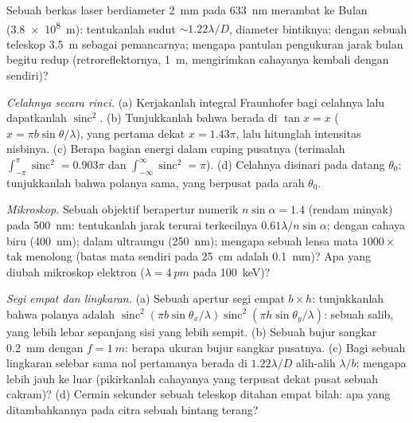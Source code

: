 \begin{exercise}[$\star$]\label{exo:b2:diffraction:4}
Sebuah berkas laser berdiameter \qty{2}{mm} pada \qty{633}{nm} merambat ke Bulan
(\qty{3.8e8}{m}): tentukanlah sudut  $\sim1.22\lambda/D$, diameter bintiknya;
dengan sebuah teleskop \qty{3.5}{m} sebagai pemancarnya; mengapa pantulan pengukuran jarak bulan begitu
redup (retroreflektornya, \qty{1}{m}, mengirimkan cahayanya kembali dengan 
sendiri)?
\end{exercise}

\begin{exercise}[$\star\star$]\label{exo:b2:diffraction:5}
\emph{Celahnya secara rinci.} (a) Kerjakanlah integral Fraunhofer bagi
celahnya lalu dapatkanlah $\operatorname{sinc}^2$. (b) Tunjukkanlah bahwa 
berada di $\tan x = x$ ($x = \pi b\sin\theta/\lambda$), yang pertama dekat $x = 1.43\pi$, lalu
hitunglah intensitas nisbinya. (c) Berapa bagian energi dalam
cuping pusatnya (terimalah $\int_{-\pi}^\pi\operatorname{sinc}^2 = 0.903\pi$ dan
$\int_{-\infty}^\infty\operatorname{sinc}^2 = \pi$). (d) Celahnya disinari pada datang
$\theta_0$: tunjukkanlah bahwa polanya sama, yang berpusat pada arah $\theta_0$.
\end{exercise}

\begin{exercise}[$\star\star$]\label{exo:b2:diffraction:6}
\emph{Mikroskop.} Sebuah objektif berapertur numerik $n\sin\alpha = 1.4$
(rendam minyak) pada \qty{500}{nm}: tentukanlah jarak terurai terkecilnya $0.61\lambda/n\sin
\alpha$; dengan cahaya biru (\qty{400}{nm}); dalam ultraungu (\qty{250}{nm}); mengapa
sebuah lensa mata $1000\times$ tak menolong (batas mata sendiri pada \qty{25}{cm} adalah
\qty{0.1}{mm})? Apa yang diubah mikroskop elektron ($\lambda = \qty{4}{pm}$ pada
\qty{100}{keV})?
\end{exercise}

\begin{exercise}[$\star\star$]\label{exo:b2:diffraction:7}
\emph{Segi empat dan lingkaran.} (a) Sebuah apertur segi empat $b \times h$:
tunjukkanlah bahwa polanya adalah $\operatorname{sinc}^2(\pi b\sin\theta_x/\lambda)\operatorname{sinc}^2(\pi h
\sin\theta_y/\lambda)$: sebuah salib, yang lebih lebar sepanjang sisi yang lebih sempit. (b) Sebuah bujur sangkar
\qty{0.2}{mm} dengan $f = \qty{1}{m}$: berapa ukuran bujur sangkar pusatnya. (c) Bagi sebuah
lingkaran selebar sama nol pertamanya berada di $1.22\lambda/D$ alih-alih $\lambda/b$:
mengapa lebih jauh ke luar (pikirkanlah cahayanya yang terpusat dekat pusat sebuah
cakram)? (d) Cermin sekunder sebuah teleskop ditahan empat bilah: apa yang
ditambahkannya pada citra sebuah bintang terang?
\end{exercise}

